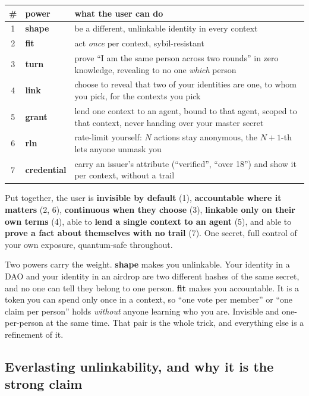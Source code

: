 \documentclass[11pt]{article}
\begin{document}
\begin{center}\small
\begin{tabular}{@{}clp{7.4cm}@{}}
\toprule
\# & power & what the user can do \\
\midrule
1 & \textbf{shape} & be a different, unlinkable identity in every context \\
2 & \textbf{fit} & act \emph{once} per context, sybil-resistant \\
3 & \textbf{turn} & prove ``I am the same person across two rounds'' in zero
    knowledge, revealing to no one \emph{which} person \\
4 & \textbf{link} & choose to reveal that two of your identities are one, to whom you
    pick, for the contexts you pick \\
5 & \textbf{grant} & lend one context to an agent, bound to that agent, scoped to that
    context, never handing over your master secret \\
6 & \textbf{rln} & rate-limit yourself: $N$ actions stay anonymous, the $N{+}1$-th lets
    anyone unmask you \\
7 & \textbf{credential} & carry an issuer's attribute (``verified'', ``over 18'') and
    show it per context, without a trail \\
\bottomrule
\end{tabular}
\end{center}

Put together, the user is \textbf{invisible by default} (1), \textbf{accountable where
it matters} (2, 6), \textbf{continuous when they choose} (3), \textbf{linkable only on
their own terms} (4), able to \textbf{lend a single context to an agent} (5), and able
to \textbf{prove a fact about themselves with no trail} (7). One secret, full control of
your own exposure, quantum-safe throughout.

\begin{intuition}
Two powers carry the weight. \textbf{shape} makes you unlinkable. Your identity in a DAO
and your identity in an airdrop are two different hashes of the same secret, and no one
can tell they belong to one person. \textbf{fit} makes you accountable. It is a token
you can spend only once in a context, so ``one vote per member'' or ``one claim per
person'' holds \emph{without} anyone learning who you are. Invisible and one-per-person
at the same time. That pair is the whole trick, and everything else is a refinement of
it.
\end{intuition}

\subsection{Everlasting unlinkability, and why it is the strong claim}
\label{sub:everlasting}
\end{document}
